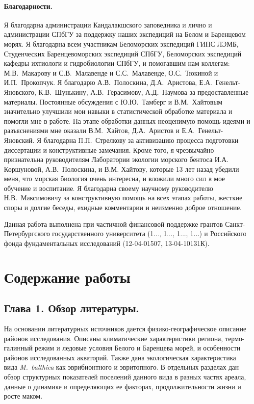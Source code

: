\paragraph{Благодарности.}
\begin{small}
Я благодарна администрации Кандалакшского заповедника и лично  и администрации СПбГУ за поддержку наших экспедиций на Белом и Баренцевом морях.
Я благодарна всем участникам Беломорских экспедиций ГИПС ЛЭМБ, Студенческих Баренцевоморских экспедиций СПбГУ, Беломорских экспедиций кафедры ихтиологи и гидробиологии СПбГУ, и помогавшим нам коллегам: М.\:В.~Макарову и С.\:В.~Малавенде и С.\:С.~Малавенде, О.\:С.~Тюкиной и И.\:П.~Прокопчук. 
Я благодарю А.\:В.~Полоскина, Д.\:А.~Аристова, Е.\:А.~Генельт-Яновского, К.\:В.~Шунькину, А.\:В.~Герасимову, А.\:Д.~Наумова за предоставленные материалы.
Постоянные обсуждения с Ю.\:Ю.~Тамберг и В.\:М.~Хайтовым значительно улучшили мои навыки в статистической обработке материала и помогли мне в работе.
На этапе обработки данных неоценимую помощь идеями и разъяснениями мне оказали В.\:М.~Хайтов, Д.\:А.~Аристов и Е.\:А.~Генельт-Яновский.
Я благодарна П.\:П.~Стрелкову за активизацию процесса подготовки диссертации и конструктивные замечания.
Кроме того, я чрезвычайно признательна руководителям Лаборатории экологии морского бентоса И.\:А. Коршуновой, А.\:В.~Полоскина,  и В.\:М. Хайтову, которые 13 лет назад убедили меня, что морская биология очень интересна, и вложили много сил в мое обучение и воспитание. 
Я благодарна своему научному руководителю Н.\:В.~Максимовичу за конструктивную помощь на всех этапах работы, жесткие споры и долгие беседы, ехидные комментарии и неизменно доброе отношение.

\vspace{3ex}

Данная работа выполнена при частичной финансовой поддержке грантов Санкт-Петер\-бург\-ского государственного университета (1..., 1..., 1..., 1...) и Российского фонда фундаментальных исследований (12-04-01507, 13-04-10131\:К). 

\end{small}

\section*{Содержание работы}

\subsection*{Глава 1. Обзор литературы.}
На основании литературных источников дается физико-географическое описание районов исследования.
Описаны климатические характеристики региона, термо-галинный режим и ледовые условия Белого и Баренцева морей, и особенности районов исследованных акваторий.
Также дана экологическая характеристика вида \textit{M.~balthica} как эврибионтного и эвритопного.
В отдельных разделах дан обзор структурных показателей поселений данного вида в разных частях ареала, данные о динамике и определяющих ее факторах, продолжительности жизни и росте маком.


